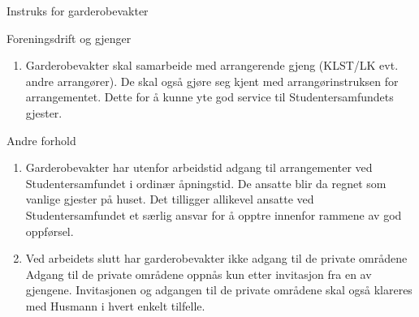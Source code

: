 \documentclass[fsbok.tex]{subfiles}
\begin{document}
\begin{instruks*}{Instruks for garderobevakter}
    \begin{instruksledd}{Foreningsdrift og gjenger}
        \begin{enumerate}
            \item Garderobevakter skal samarbeide med arrangerende gjeng (KLST/LK evt. andre arrangører). De skal også gjøre seg
                kjent med arrangørinstruksen for arrangementet. Dette for å kunne yte god service til Studentersamfundets gjester.
        \end{enumerate}
    \end{instruksledd}

    \begin{instruksledd}{Andre forhold}
        \begin{enumerate}
            \item Garderobevakter har utenfor arbeidstid adgang til arrangementer ved Studentersamfundet i ordinær åpningstid. De
                ansatte blir da regnet som vanlige gjester på huset. Det tilligger allikevel ansatte ved Studentersamfundet et særlig
                ansvar for å opptre innenfor rammene av god oppførsel.
            \item Ved arbeidets slutt har garderobevakter ikke adgang til de private områdene Adgang til de private områdene oppnås
                kun etter invitasjon fra en av gjengene. Invitasjonen og adgangen til de private områdene skal også klareres med
                Husmann i hvert enkelt tilfelle.
        \end{enumerate}
    \end{instruksledd}

\end{instruks*}
\end{document}
